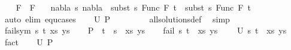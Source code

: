\begin{isabellebody}
\ \ \isamarkupfalse%
\ {\isacartoucheopen}F{}\ {\isasymnoteq}\ F{}{\isacartoucheclose}\ \isamarkupfalse%
\ {\isachardoublequoteopen}{\isasymnexists}\ nabla\ s{\isachardot}{\kern0pt}\ nabla\ {\isasymturnstile}\ subst\ s\ {\isacharparenleft}{\kern0pt}Func\ F{}\ t{}{\isacharparenright}{\kern0pt}\ {\isasymapprox}\ subst\ s\ {\isacharparenleft}{\kern0pt}Func\ F{}\ t{}{\isacharparenright}{\kern0pt}{\isachardoublequoteclose}\isanewline
\ \ \ \ \ \isamarkupfalse%
\ {\isacharparenleft}{\kern0pt}auto\ elim{\isacharcolon}{\kern0pt}\ equ{\isachardot}{\kern0pt}cases{\isacharparenright}{\kern0pt}\isanewline
\ \ \isamarkupfalse%
\ {\isachardoublequoteopen}U\ {\isacharquery}{\kern0pt}P\ {\isacharequal}{\kern0pt}\ {\isacharbraceleft}{\kern0pt}{\isacharbraceright}{\kern0pt}{\isachardoublequoteclose}\ \isanewline
\ \ \ \ \isamarkupfalse%
\ all{\isacharunderscore}{\kern0pt}solutions{\isacharunderscore}{\kern0pt}def\ \isamarkupfalse%
\ simp\isanewline
{}\isamarkupfalse%
\isanewline
\ \ \isamarkupfalse%
\ {\isacharparenleft}{\kern0pt}fail{\isacharunderscore}{\kern0pt}sym\ s\ t\ xs\ ys{\isacharparenright}{\kern0pt}\isanewline
\ \ \isamarkupfalse%
\ {\isacharquery}{\kern0pt}P\ {\isacharequal}{\kern0pt}\ {\isachardoublequoteopen}{\isacharparenleft}{\kern0pt}t\ {\isasymapprox}{\isacharquery}{\kern0pt}\ s\ {\isacharhash}{\kern0pt}\ xs{\isacharcomma}{\kern0pt}\ ys{\isacharparenright}{\kern0pt}{\isachardoublequoteclose}\isanewline
\ \ \isamarkupfalse%
\ {\isachardoublequoteopen}fail\ {\isacharparenleft}{\kern0pt}{\isacharparenleft}{\kern0pt}s{\isacharcomma}{\kern0pt}\ t{\isacharparenright}{\kern0pt}\ {\isacharhash}{\kern0pt}\ xs{\isacharcomma}{\kern0pt}\ ys{\isacharparenright}{\kern0pt}{\isachardoublequoteclose}\isanewline
\ \ \ \ {\isachardoublequoteopen}U\ {\isacharparenleft}{\kern0pt}{\isacharparenleft}{\kern0pt}s{\isacharcomma}{\kern0pt}\ t{\isacharparenright}{\kern0pt}\ {\isacharhash}{\kern0pt}\ xs{\isacharcomma}{\kern0pt}\ ys{\isacharparenright}{\kern0pt}\ {\isacharequal}{\kern0pt}\ {\isacharbraceleft}{\kern0pt}{\isacharbraceright}{\kern0pt}{\isachardoublequoteclose}\ \isamarkupfalse%
\ fact{\isacharplus}{\kern0pt}\isanewline
\ \ \isamarkupfalse%
\ {\isachardoublequoteopen}U\ {\isacharquery}{\kern0pt}P\ {\isacharequal}{\kern0pt}\ {\isacharbraceleft}{\kern0pt}{\isacharbraceright}{\kern0pt}{\isachardoublequoteclose}\isanewline

\end{isabellebody}
